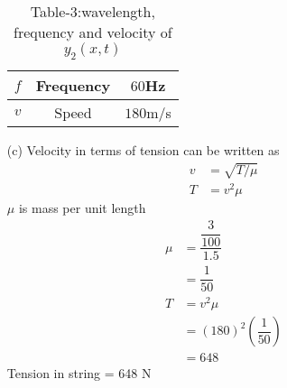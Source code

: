 \documentclass[journal,12pt,twocolumn]{IEEEtran}
\theoremstyle{remark}
\begin{document}
\begin{enumerate}
\begin{table}[h]
\begin{tabular}{|c|c|c|}
    \hline
    $f$ & Frequency & $60$Hz \\
    \hline
    $v$ & Speed & $180$m/s\\
    \hline
  \end{tabular}
  \caption{Table-3:wavelength, frequency and velocity of $y_2(x,t)$}
  \label{tab:mytable2}
\end{table}
\item[(c)] Velocity in terms of tension can be written as
\begin{align}
v&=\sqrt{T/\mu}\\
T&=v^2\mu
\end{align}
$\mu$ is mass per unit length
\begin{align}
\mu&=\dfrac{\dfrac{3}{100}}{1.5}\\
&=\dfrac{1}{50}\\
T&=v^2\mu\\
&=(180)^2(\dfrac{1}{50})\\
&=648
\end{align}
Tension in string = 648 N
\end{enumerate}
\end{document}
